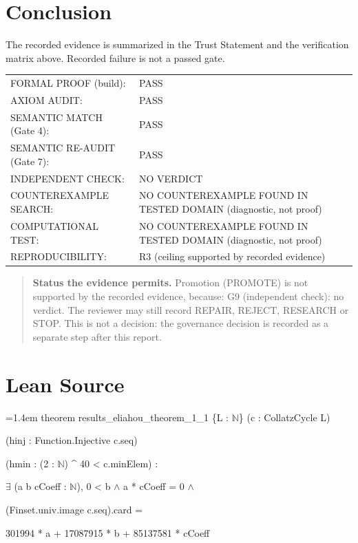 \documentclass[11pt]{article}
\begin{document}
\section{Conclusion}
The recorded evidence is summarized in the Trust Statement and the verification matrix above. Recorded failure is not a passed gate.
\begin{center}\begin{tabular}{@{}p{}p{}@{}}
FORMAL PROOF (build): & PASS \\
AXIOM AUDIT: & PASS \\
SEMANTIC MATCH (Gate 4): & PASS \\
SEMANTIC RE-AUDIT (Gate 7): & PASS \\
INDEPENDENT CHECK: & NO VERDICT \\
COUNTEREXAMPLE SEARCH: & NO COUNTEREXAMPLE FOUND IN TESTED DOMAIN (diagnostic, not proof) \\
COMPUTATIONAL TEST: & NO COUNTEREXAMPLE FOUND IN TESTED DOMAIN (diagnostic, not proof) \\
REPRODUCIBILITY: & R3 (ceiling supported by recorded evidence) \\
\end{tabular}\end{center}
\begin{quote}\textbf{Status the evidence permits.} Promotion (PROMOTE) is not supported by the recorded evidence, because: G9 (independent check): no verdict. The reviewer may still record REPAIR, REJECT, RESEARCH or STOP. This is not a decision: the governance decision is recorded as a separate step after this report.\end{quote}
\appendix
\section{Lean Source}
{\footnotesize\ttfamily\raggedright\hangindent=1.4em\noindent
\hspace*{0.00em}theorem results\_\allowbreak{}eliahou\_\allowbreak{}theorem\_\allowbreak{}1\_\allowbreak{}1 \{L : \ensuremath{\mathbb{N}}\} (c : CollatzCycle L)\par
\hspace*{2.20em}(hinj : Function.\allowbreak{}Injective c.\allowbreak{}seq)\par
\hspace*{2.20em}(hmin : (2 : \ensuremath{\mathbb{N}}) \textasciicircum{} 40 < c.\allowbreak{}minElem) :\par
\hspace*{2.20em}\ensuremath{\exists} (a b cCoeff : \ensuremath{\mathbb{N}}), 0 < b \ensuremath{\wedge} a * cCoeff = 0 \ensuremath{\wedge}\par
\hspace*{3.30em}(Finset.\allowbreak{}univ.\allowbreak{}image c.\allowbreak{}seq).\allowbreak{}card =\par
\hspace*{4.40em}301994 * a + 17087915 * b + 85137581 * cCoeff\par
}
\end{document}
